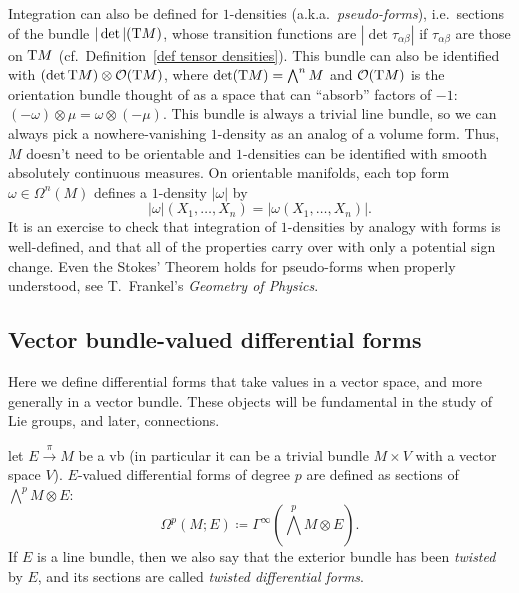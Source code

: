 \begin{rem}
    Integration can also be defined for $1$-densities (a.k.a.~\emph{pseudo-forms}), i.e.\ sections of the bundle $|\det|(\mathrm{T} M)$, whose transition functions are $|\det\tau_{\alpha\beta}|$ if $\tau_{\alpha\beta}$ are those on $\mathrm{T} M$ (cf.\ Definition~\ref{def tensor densities}). This bundle can also be identified with $(\det \mathrm{T} M)\otimes \mathcal{O}(\mathrm{T} M)$, where $\det (\mathrm{T} M)=\bigwedge^n M$ and $\mathcal{O}(\mathrm{T} M)$ is the orientation bundle thought of as a space that can ``absorb'' factors of $- 1$: $(-\omega)\otimes \mu=\omega\otimes (-\mu)$. This bundle is always a trivial line bundle, so we can always pick a nowhere-vanishing $1$-density as an analog of a volume form. Thus, $M$ doesn't need to be orientable and $1$-densities can be identified with smooth absolutely continuous measures. On orientable manifolds, each top form $\omega\in\Omega^n(M)$ defines a $1$-density $|\omega|$ by 
    \[|\omega|(X_1,\ldots,X_n)=|\omega(X_1,\ldots,X_n)|.\]
    It is an exercise to check that integration of $1$-densities by analogy with forms is well-defined, and that all of the properties carry over with only a potential sign change. Even the Stokes' Theorem holds for pseudo-forms when properly understood, see T.~Frankel's \emph{Geometry of Physics}.
\end{rem}







\subsection{Vector bundle-valued differential forms}

Here we define differential forms that take values in a vector space, and more generally in a vector bundle. These objects will be fundamental in the study of Lie groups, and later, connections.

\begin{defn}
    let $E\overset\pi\to M$ be a \gls{vb} (in particular it can be a trivial bundle $M\times V$ with a vector space $V$). $E$-valued differential forms of degree $p$ are defined as sections of $\bigwedge^pM\otimes E$:
    \[\Omega^p(M;E)\coloneqq \Gamma^\infty\left(\bigwedge^pM\otimes E\right).\]
     If $E$ is a line bundle, then we also say that the exterior bundle has been \emph{twisted} by $E$, and its sections are called \emph{twisted differential forms}.
\end{defn}


